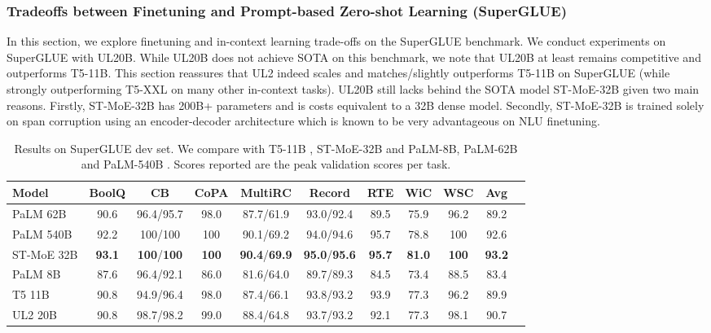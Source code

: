 \documentclass[10pt]{article}
\begin{document}
\subsubsection{Tradeoffs between Finetuning and Prompt-based Zero-shot Learning (SuperGLUE)}
In this section, we explore finetuning and in-context learning trade-offs on the SuperGLUE benchmark. 
We conduct experiments on SuperGLUE with UL20B. While UL20B does not achieve SOTA on this benchmark, we note that UL20B at least remains competitive and outperforms T5-11B. This section reassures that UL2 indeed scales and matches/slightly outperforms T5-11B on SuperGLUE (while strongly outperforming T5-XXL on many other in-context tasks). UL20B still lacks behind the SOTA model ST-MoE-32B given two main reasons. Firstly, ST-MoE-32B has 200B+ parameters and is costs equivalent to a 32B dense model. Secondly, ST-MoE-32B is trained solely on span corruption using an encoder-decoder architecture which is known to be very advantageous on NLU finetuning.

\begin{table}[h!]
    \centering
    \small
        \caption{Results on SuperGLUE dev set. We compare with T5-11B \citep{raffel2019exploring}, ST-MoE-32B \citep{zoph2022designing} and PaLM-8B, PaLM-62B and PaLM-540B \citep{chowdhery2022palm}. Scores reported are the peak validation scores per task.}
    \label{tab:finetune-superglue}
    \begin{tabular}{lcccccccccc}
    \toprule
  Model      & BoolQ & CB & CoPA & MultiRC & Record & RTE & WiC & WSC & Avg   \\
  \midrule
  PaLM 62B & 90.6 & 96.4/95.7  & 98.0 & 87.7/61.9 & 93.0/92.4 &  89.5 & 75.9 & 96.2 & 89.2  \\
      PaLM 540B & 92.2 & 100/100 & 100 & 90.1/69.2 & 94.0/94.6 & 95.7 & 78.8 & 100  & 92.6 \\
     ST-MoE 32B  & \textbf{93.1} & \textbf{100}/\textbf{100} & \textbf{100} & \textbf{90.4}/\textbf{69.9} & \textbf{95.0}/\textbf{95.6} & \textbf{95.7} & \textbf{81.0} & \textbf{100} & \textbf{93.2} \\
     \midrule 
     PaLM 8B  & 87.6 & 96.4/92.1 & 86.0 & 81.6/64.0 & 89.7/89.3 & 84.5 & 73.4 & 88.5 & 83.4\\
    T5 11B      & 90.8 & 94.9/96.4 & 98.0 & 87.4/66.1 & 93.8/93.2 & 93.9 & 77.3 & 96.2 & 89.9 \\
     UL2 20B & 90.8 & 98.7/98.2 & 99.0 & 88.4/64.8 & 93.7/93.2 & 92.1 & 77.3 & 98.1 &  90.7  \\
         \bottomrule
    \end{tabular}
\end{table}
  
\end{document}
